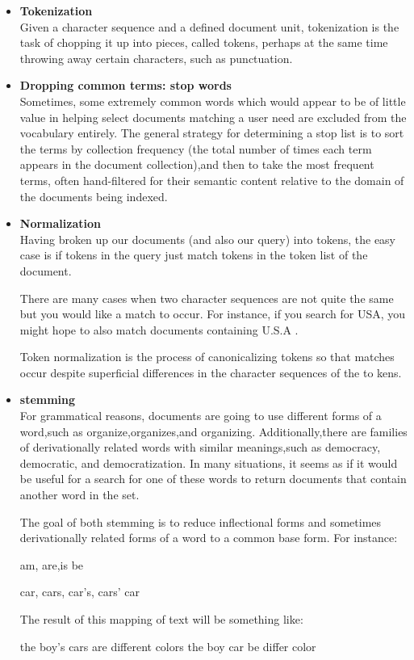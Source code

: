 \begin{itemize}
     \item \textbf{Tokenization}\\
     Given a character sequence and a defined document unit, tokenization is the
     task of chopping it up into pieces, called tokens, perhaps at the same time
     throwing away certain characters, such as punctuation.
     
     
     \item \textbf{Dropping common terms: stop words}\\
     Sometimes, some extremely common words which would appear to be of
     little value in helping select documents matching a user need are excluded
     from the vocabulary entirely.
     The general strategy for determining a stop list is to sort the terms by collection frequency (the total number of times each term appears in the document collection),and then to take the most frequent terms, often hand-filtered for their semantic content relative to the domain of the documents being indexed.
     
     
     \item  \textbf{Normalization}\\ 
     Having broken up our documents (and also our query) into tokens, the easy
     case is if tokens in the query just match tokens in the token list of the document.
     
     There are many cases when two character sequences are not quite the same but you would like a match to occur. For instance, if you search for USA, you might hope to also match documents containing U.S.A .
     
     Token normalization is the process of canonicalizing tokens so that matches occur despite superficial differences in the character sequences of the to kens.
    
    \item  \textbf{stemming}\\
    For grammatical reasons, documents are going to use different forms of a word,such as organize,organizes,and organizing. Additionally,there are families of derivationally related words with similar meanings,such as democracy, democratic, and democratization. In many situations, it seems as if it would be useful for a search for one of these words to return documents that contain another word in the set.
    
    The goal of both stemming is to reduce inﬂectional forms and sometimes derivationally related forms of a word to a common base form.
    For instance:
    
    am, are,is \Rightarrow  be 
    
    
    car, cars, car’s, cars’ \Rightarrow  car 
      
    
    The result of this mapping of text will be something like:
      
    
    the boy’s cars are different colors  \Rightarrow   the  boy  car  be  differ   color
      
      
\end{itemize} 

